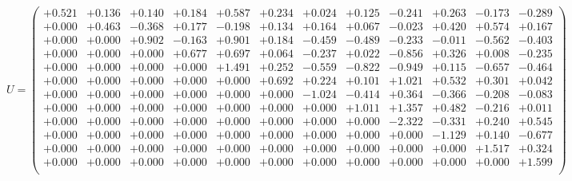 \documentclass[9pt]{article}
\theoremstyle{plain}
\theoremstyle{definition}
\theoremstyle{remark}
\numberwithin{equation}{section}
\begin{document}
$U = \left(
\begin{array}{
cccccccccccc}
+0.521 & +0.136 & +0.140 & +0.184 & +0.587 & +0.234 & +0.024 & +0.125 & -0.241 & +0.263 & -0.173 & -0.289 \\
+0.000 & +0.463 & -0.368 & +0.177 & -0.198 & +0.134 & +0.164 & +0.067 & -0.023 & +0.420 & +0.574 & +0.167 \\
+0.000 & +0.000 & +0.902 & -0.163 & +0.901 & +0.184 & -0.459 & -0.489 & -0.233 & -0.011 & -0.562 & -0.403 \\
+0.000 & +0.000 & +0.000 & +0.677 & +0.697 & +0.064 & -0.237 & +0.022 & -0.856 & +0.326 & +0.008 & -0.235 \\
+0.000 & +0.000 & +0.000 & +0.000 & +1.491 & +0.252 & -0.559 & -0.822 & -0.949 & +0.115 & -0.657 & -0.464 \\
+0.000 & +0.000 & +0.000 & +0.000 & +0.000 & +0.692 & +0.224 & +0.101 & +1.021 & +0.532 & +0.301 & +0.042 \\
+0.000 & +0.000 & +0.000 & +0.000 & +0.000 & +0.000 & -1.024 & -0.414 & +0.364 & -0.366 & -0.208 & -0.083 \\
+0.000 & +0.000 & +0.000 & +0.000 & +0.000 & +0.000 & +0.000 & +1.011 & +1.357 & +0.482 & -0.216 & +0.011 \\
+0.000 & +0.000 & +0.000 & +0.000 & +0.000 & +0.000 & +0.000 & +0.000 & -2.322 & -0.331 & +0.240 & +0.545 \\
+0.000 & +0.000 & +0.000 & +0.000 & +0.000 & +0.000 & +0.000 & +0.000 & +0.000 & -1.129 & +0.140 & -0.677 \\
+0.000 & +0.000 & +0.000 & +0.000 & +0.000 & +0.000 & +0.000 & +0.000 & +0.000 & +0.000 & +1.517 & +0.324 \\
+0.000 & +0.000 & +0.000 & +0.000 & +0.000 & +0.000 & +0.000 & +0.000 & +0.000 & +0.000 & +0.000 & +1.599 \\
\end{array}
\right)$ \newline 
\end{document}
